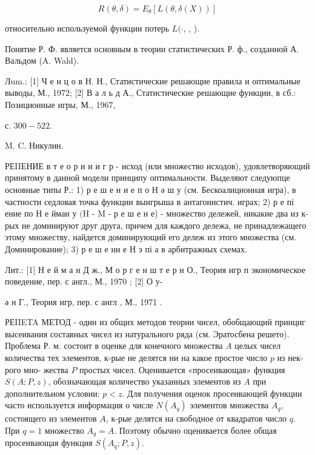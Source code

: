 \documentclass[10pt]{article}
\begin{document}
\[

R(\theta, \delta)=E_{\theta}[L(\theta, \delta(X))]

\]



относительно используемой функции потерь $L(\cdot$, , ).



Понятие Р. Ф. является основным в теории статистических Р. ф., созданной А. Вальдом (A. Wald).



Лum.: [1] Ч е н ц о в Н. Н., Статистические решающие правила и оптимальные выводы, М., 1972; [2] В а л ь д А., Статистические решающие функции, в сб.: Позиционные игры, М., 1967,

с. $300-522$.

M. C. Никулин.



РЕIIЕНИЕ в т е о р и и и г р - исход (или множество исходов), удовлетворяющий принятому в данной модели принципу оптимальности. Выделяют следуюпце основные типы Р.: 1) р е ш е н и е п о Н ә ш у (см. Бескоалиционная игра), в частности седловая точка функции выигрыша в антагонистич. играх; 2) р е пі ение по Н е йман у $(\mathrm{H}$ - $\mathrm{M}$ - р е ш е н е) - множество дележей, никакие два из к-рых не доминируют друг друга, причем для каждого дележа, не принадлежащего этому множеству, найдется доминирующий его дележ из этого множества (см. Доминирование); 3) р е ш е ни е Н э пі а в арбитражных схемах.



Лит.: [1] Н е й м а н Д ж., М о р г е н ш т е р н О., Теория игр п экономическое поведение, пер. с англ., М., 1970 ; [2] О у-

ә н Г., Теория игр, пер. с англ , М., 1971 .



РЕIIETA МЕТОД - один из общих методов теории чисел, обобщающий принциг высеивания составных чисел из натурального ряда (см. Эратосбена решето). Проблема Р. м. состоит в оценке для конечного множества $A$ целых чисел количества тех элементов, к-рые не делятся ни на какое простое число $p$ из нек-рого мно- жества $P$ простых чисел. Оценивается «просеивающая» функция $S(A ; P, z)$, обозначающая количество указанных элементов из $A$ при дополнительном условии: $p<z$. Для получения оценок просеивающей функции часто используется информация о числе $N\left(A_{q}\right)$ элементов множества $A_{q}$, состоящего из элементов $A$, к-рые делятся на свободное от квадратов число $q$. При $q=1$ множество $A_{q}=A$. Поэтому обычно оценивается более общая просеивающая функция $S\left(A_{q} ; P, z\right)$.
\end{document}
